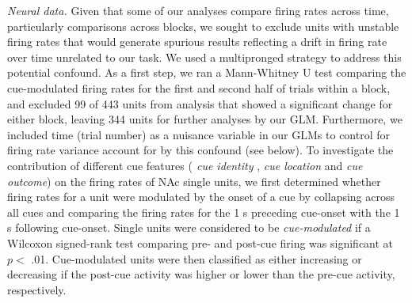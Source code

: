 \documentclass[11pt]{article}
\providecommand{\DIFadd}[1]{{\protect\color{red} \sf #1}} %
\providecommand{\DIFdel}[1]{} %
\providecommand{\DIFaddbegin}{} %
\providecommand{\DIFaddend}{} %
\providecommand{\DIFdelbegin}{} %
\providecommand{\DIFdelend}{} %
\newcommand{\DIFscaledelfig}{0.5}
\newlength{\DIFdelgraphicswidth} %
\newlength{\DIFdelgraphicsheight} %
\newcommand{\DIFaddincludegraphics}[2][]{{\color{red}\fbox{\DIFOincludegraphics[#1]{#2}}}} %
\newcommand{\DIFdelincludegraphics}[2][]{%
\sbox{\DIFdelgraphicsbox}{\DIFOincludegraphics[#1]{#2}}%
\settoboxwidth{\DIFdelgraphicswidth}{\DIFdelgraphicsbox} %
\settoboxtotalheight{\DIFdelgraphicsheight}{\DIFdelgraphicsbox} %
\scalebox{\DIFscaledelfig}{%
\parbox[b]{\DIFdelgraphicswidth}{\usebox{\DIFdelgraphicsbox}\\[-\baselineskip] \rule{\DIFdelgraphicswidth}{0em}}\llap{\resizebox{\DIFdelgraphicswidth}{\DIFdelgraphicsheight}{%
\setlength{\unitlength}{\DIFdelgraphicswidth}%
\begin{picture}(1,1)%
\thicklines\linethickness{2pt} %
{\color[rgb]{1,0,0}\put(0,0){\framebox(1,1){}}}%
{\color[rgb]{1,0,0}\put(0,0){\line( 1,1){1}}}%
{\color[rgb]{1,0,0}\put(0,1){\line(1,-1){1}}}%
\end{picture}%
}\hspace*{3pt}}} %
} %
\DeclareRobustCommand{\DIFaddbegin}{\DIFOaddbegin \let\includegraphics\DIFaddincludegraphics} %
\DeclareRobustCommand{\DIFaddend}{\DIFOaddend \let\includegraphics\DIFOincludegraphics} %
\DeclareRobustCommand{\DIFdelbegin}{\DIFOdelbegin \let\includegraphics\DIFdelincludegraphics} %
\DeclareRobustCommand{\DIFdelend}{\DIFOaddend \let\includegraphics\DIFOincludegraphics} %
\begin{document}
{\it Neural data.} \DIFaddbegin \DIFadd{Given that some of our analyses compare firing rates across time,
particularly comparisons across blocks, we sought to exclude units
with unstable firing rates that would generate spurious results
reflecting a drift in firing rate over time unrelated to our task. We used a multipronged strategy to address this potential confound. As a first step, we ran a Mann-Whitney U test comparing the cue-modulated firing
rates for the first and second half of trials within a block, and
excluded 99 of 443 units from analysis that showed a significant change for
either block, leaving 344 units for further analyses by our GLM. Furthermore, we included time (trial number) as a nuisance variable in our GLMs to control for firing rate variance account for by this confound (see below). }\DIFaddend To investigate the contribution of different cue
features \DIFaddbegin \DIFadd{(}\DIFaddend {\DIFdelbegin \DIFdel{cue identity and cue outcome}\DIFdelend \DIFaddbegin \it \DIFadd{cue identity}}\DIFadd{, }{\it \DIFadd{cue location}} \DIFadd{and }{\it \DIFadd{cue outcome}}\DIFaddend ) on the firing rates of NAc
single units, we first determined whether firing rates for a unit
were modulated by the onset of a cue by collapsing across all cues
and comparing the firing rates for the 1 s preceding cue-onset with
the 1 s following cue-onset. Single units were considered to be {\it
cue-modulated} if a Wilcoxon signed-rank test comparing pre- and
post-cue firing was significant at $p <$ .01. Cue-modulated units
were then classified as either increasing or decreasing if the
post-cue activity was higher or lower than the pre-cue activity,
respectively.
\end{document}

